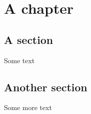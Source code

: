 \documentclass[10pt]{book}
\begin{document}

%

\frontmatter

\tableofcontents

\chapter{A chapter}\label{ch:1}
\section{A section}\label{sec:1}
Some text
%

\mainmatter\setcounter{page}{1000}

\section{Another section}\label{sec:2}
Some more text



%






%
%
\end{document}

